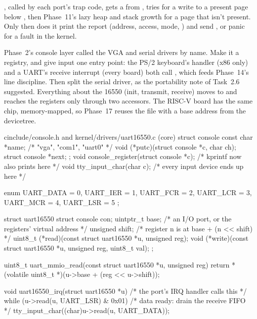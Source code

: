 \documentclass[11pt,a4paper]{article}
\begin{document}
, called by each port's trap code, gets a  from ,
tries  for a write to a present page below , then Phase~11's lazy heap and stack
growth for a page that isn't present. Only then does it print the report (address, access, mode, ) and
send , or panic for a fault in the kernel.

Phase~2's console layer called the VGA and serial drivers by name. Make it a registry, and give input one entry point:
the PS/2 keyboard's handler (x86 only) and a UART's receive interrupt (every board) both call ,
which feeds Phase~14's line discipline. Then split the serial driver, as the portability note of Task~2.6 suggested.
Everything about the 16550 (init, transmit, receive) moves to  and reaches the
registers only through two accessors. The RISC-V  board has the same chip, memory-mapped, so Phase~17 reuses
the file with a base address from the devicetree.

\begin{lst}{c}{include/console.h and kernel/drivers/uart16550.c (core)}
struct console {
    const char     *name;                        /* "vga", "com1", "uart0"          */
    void          (*putc)(struct console *c, char ch);
    struct console *next;
};
void console_register(struct console *c);        /* kprintf now also prints here    */
void tty_input_char(char c);                     /* every input device ends up here */

enum { UART_DATA = 0, UART_IER = 1, UART_FCR = 2, UART_LCR = 3, UART_MCR = 4, UART_LSR = 5 };

struct uart16550 {
    struct console con;
    uintptr_t      base;               /* an I/O port, or the registers' virtual address */
    unsigned       shift;              /* register n is at base + (n << shift)           */
    uint8_t      (*read)(const struct uart16550 *u, unsigned reg);
    void         (*write)(const struct uart16550 *u, unsigned reg, uint8_t val);
};

uint8_t uart_mmio_read(const struct uart16550 *u, unsigned reg)
{
    return *(volatile uint8_t *)(u->base + (reg << u->shift));
}

void uart16550_irq(struct uart16550 *u)          /* the port's IRQ handler calls this  */
{
    while (u->read(u, UART_LSR) & 0x01)          /* data ready: drain the receive FIFO */
        tty_input_char((char)u->read(u, UART_DATA));
}
\end{lst}
\end{document}
